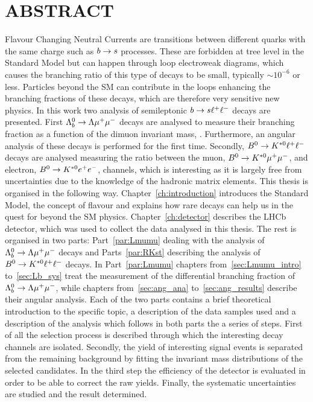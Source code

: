 \chapter*{ABSTRACT}
%
Flavour Changing Neutral Currents are transitions between different quarks with the same charge such as $b\rightarrow s$ processes. These are forbidden at tree level in the Standard Model but
can happen through loop electroweak diagrams, which causes the branching ratio of this type of decays
to be small, typically $\sim 10^{-6}$ or less. Particles beyond the SM can contribute in the loops enhancing
the branching fractions of these decays, which are therefore very sensitive new physics.
In this work two analysis of semileptonic $b\rightarrow s\ell^+ \ell^-$ decays are presented.
First $\Lambda^0_b\rightarrow\Lambda\mu^+\mu^-$ decays are analysed to measure their branching fraction as a function
of the dimuon invariant mass, \qsq. Furthermore, an angular analysis of these decays is performed for the first time. Secondly, $B^0\rightarrow K^{*0}\ell^+ \ell^-$ decays are analysed measuring the ratio between the muon, $B^0\rightarrow K^{*0}\mu^+\mu^-$, and electron, $B^0\rightarrow K^{*0}e^+ e^-$, channels, which is interesting as it is largely free
from uncertainties due to the knowledge of the hadronic matrix elements.
This thesis is organised in the following way. Chapter~\ref{ch:introduction} introduces the Standard Model,
the concept of flavour and explains how rare decays can help us in the quest for beyond the SM physics.
Chapter~\ref{ch:detector} describes the LHCb detector, which was used to collect the data analysed in this thesis.
The rest is organised in two parts: Part~\ref{par:Lmumu} dealing with the analysis of $\Lambda^0_b\rightarrow\Lambda\mu^+\mu^-$ 
decays and Parts~\ref{par:RKst} describing the analysis of $B^0\rightarrow K^{*0}\ell^+ \ell^-$ decays.
In Part~\ref{par:Lmumu}  chapters from~\ref{sec:Lmumu_intro} to~\ref{sec:Lb_sys} treat the
measurement of the differential branching fraction of $\Lambda^0_b\rightarrow\Lambda\mu^+\mu^-$, while chapters
from~\ref{sec:ang_ana} to~\ref{sec:ang_results} describe their angular analysis.
Each of the two parts contains a brief theoretical introduction to the specific topic, a description of the
data samples used and a description of the analysis which follows in both parts the a series of steps.
First of all the selection process is described through which the interesting decay channels are isolated.
Secondly, the yield of interesting signal events is separated from the remaining background by
fitting the invariant mass distributions of the selected candidates. In the third step the efficiency of the detector
is evaluated in order to be able to correct the raw yields. Finally, the systematic uncertainties are studied
and the result determined.
%
\clearpage

